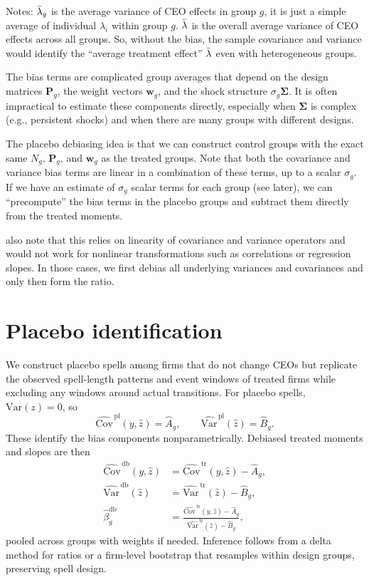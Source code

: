 \documentclass[11pt,a4paper]{article}
\newcommand{\Var}{\text{Var}}
\newcommand{\Cov}{\text{Cov}}
\begin{document}
Notes: $\Bar\lambda_g$ is the average variance of CEO effects in group $g$, it is just a simple average of individual $\lambda_i$ within group $g$. $\Bar\lambda$ is the overall average variance of CEO effects across all groups. So, without the bias, the sample covariance and variance would identify the ``average treatment effect'' $\Bar\lambda$ even with heterogeneous groups.

The bias terms are complicated group averages that depend on the design matrices $\mathbf P_g$, the weight vectors $\mathbf w_g$, and the shock structure $\sigma_g\mathbf\Sigma$. It is often impractical to estimate these components directly, especially when $\mathbf\Sigma$ is complex (e.g., persistent shocks) and when there are many groups with different designs.

The placebo debiasing idea is that we can construct control groups with the exact same $N_g$, $\mathbf P_g$, and $\mathbf w_g$ as the treated groups. Note that both the covariance and variance bias terms are linear in a combination of these terms, up to a scalar $\sigma_g$. If we have an estimate of $\sigma_g$ scalar terms for each group (see later), we can ``precompute'' the bias terms in the placebo groups and subtract them directly from the treated moments.

also note that this relies on linearity of covariance and variance operators and would not work for nonlinear transformations such as correlations or regression slopes. In those cases, we first debias all underlying variances and covariances and only then form the ratio.

\section{Placebo identification} 
We construct placebo spells among firms that do not change CEOs but replicate the observed spell-length patterns and event windows of treated firms while excluding any windows around actual transitions. For placebo spells, $\Var(z)=0$, so
\begin{equation}
\widehat{\Cov}^{\,\text{pl}}(y,\hat z)=\hat A_g,\qquad \widehat{\Var}^{\,\text{pl}}(\hat z)=\hat B_g.
\end{equation}
These identify the bias components nonparametrically. Debiased treated moments and slopes are then
\begin{align}
\widehat{\Cov}^{\,\text{db}}(y,\hat z) &= \widehat{\Cov}^{\,\text{tr}}(y,\hat z) - \hat A_g,\\
\widehat{\Var}^{\,\text{db}}(\hat z) &= \widehat{\Var}^{\,\text{tr}}(\hat z) - \hat B_g,\\
\hat\beta^{\text{db}}_g &= \frac{\widehat{\Cov}^{\,\text{tr}}(y,\hat z)-\hat A_g}{\widehat{\Var}^{\,\text{tr}}(\hat z)-\hat B_g},
\end{align}
pooled across groups with weights if needed. Inference follows from a delta method for ratios or a firm-level bootstrap that resamples within design groups, preserving spell design.
\end{document}

